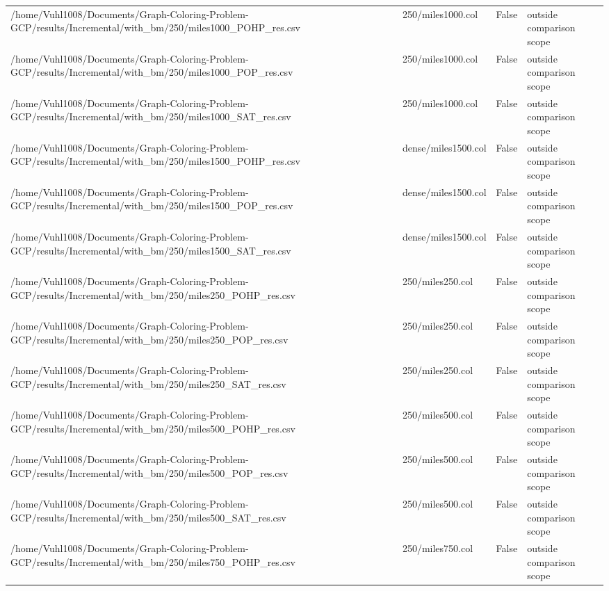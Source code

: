 \begin{table}[htbp]
\begin{tabular}{llll}
/home/Vuhl1008/Documents/Graph-Coloring-Problem-GCP/results/Incremental/with\_bm/250/miles1000\_POHP\_res.csv & 250/miles1000.col & False & outside comparison scope \\
/home/Vuhl1008/Documents/Graph-Coloring-Problem-GCP/results/Incremental/with\_bm/250/miles1000\_POP\_res.csv & 250/miles1000.col & False & outside comparison scope \\
/home/Vuhl1008/Documents/Graph-Coloring-Problem-GCP/results/Incremental/with\_bm/250/miles1000\_SAT\_res.csv & 250/miles1000.col & False & outside comparison scope \\
/home/Vuhl1008/Documents/Graph-Coloring-Problem-GCP/results/Incremental/with\_bm/250/miles1500\_POHP\_res.csv & dense/miles1500.col & False & outside comparison scope \\
/home/Vuhl1008/Documents/Graph-Coloring-Problem-GCP/results/Incremental/with\_bm/250/miles1500\_POP\_res.csv & dense/miles1500.col & False & outside comparison scope \\
/home/Vuhl1008/Documents/Graph-Coloring-Problem-GCP/results/Incremental/with\_bm/250/miles1500\_SAT\_res.csv & dense/miles1500.col & False & outside comparison scope \\
/home/Vuhl1008/Documents/Graph-Coloring-Problem-GCP/results/Incremental/with\_bm/250/miles250\_POHP\_res.csv & 250/miles250.col & False & outside comparison scope \\
/home/Vuhl1008/Documents/Graph-Coloring-Problem-GCP/results/Incremental/with\_bm/250/miles250\_POP\_res.csv & 250/miles250.col & False & outside comparison scope \\
/home/Vuhl1008/Documents/Graph-Coloring-Problem-GCP/results/Incremental/with\_bm/250/miles250\_SAT\_res.csv & 250/miles250.col & False & outside comparison scope \\
/home/Vuhl1008/Documents/Graph-Coloring-Problem-GCP/results/Incremental/with\_bm/250/miles500\_POHP\_res.csv & 250/miles500.col & False & outside comparison scope \\
/home/Vuhl1008/Documents/Graph-Coloring-Problem-GCP/results/Incremental/with\_bm/250/miles500\_POP\_res.csv & 250/miles500.col & False & outside comparison scope \\
/home/Vuhl1008/Documents/Graph-Coloring-Problem-GCP/results/Incremental/with\_bm/250/miles500\_SAT\_res.csv & 250/miles500.col & False & outside comparison scope \\
/home/Vuhl1008/Documents/Graph-Coloring-Problem-GCP/results/Incremental/with\_bm/250/miles750\_POHP\_res.csv & 250/miles750.col & False & outside comparison scope \\

\end{tabular}
\end{table}
